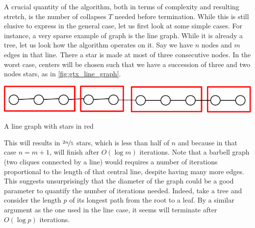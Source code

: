 A crucial quantity of the \gtx{} algorithm, both in terms of complexity and resulting stretch, is
the number of collapses $T$ needed before termination. While this is still elusive to express in the
general case, let us first look at some simple cases. For instance, a very sparse example of graph
is the line graph. While it is already a tree, let us look how the \gtx{} algorithm operates on it.
Say we have $n$ nodes and $m$ edges in that line. There a star is made at most of three
consecutive nodes. In the worst case, centers will be chosen such that we have a succession of three
and two nodes stars, as in \autoref{fig:gtx_line_graph}.%
\begin{marginfigure}
  \centering
  \includegraphics[width=0.9\linewidth]{assets/tmp-code/line_graph.pdf}
  \caption{A line graph with stars in red}
  \label{fig:gtx_line_graph}
\end{marginfigure}
This will results in $\nicefrac{2n}{5}$ stars, which is less than half of $n$ and because in that
case $n=m+1$, \gtx{} will finish after $O(\log m)$ iterations. Note that a barbell graph (two
cliques connected by a line) would requires a number of iterations proportional to the length of that
central line, despite having many more edges. This suggests unsurprisingly that the diameter of the graph
could be a good parameter to quantify the number of iterations needed. Indeed, take a tree and consider
the length $p$ of its longest path from the root to a leaf. By a similar argument as the one used in
the line case, it seems \gtx{} will terminate after $O(\log p)$ iterations.

